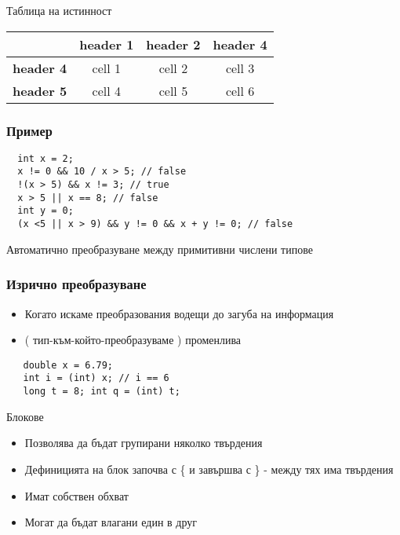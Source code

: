 \documentclass{beamer}
\begin{document}
\begin{frame}{Таблица на истинност}
  \transdissolve 
  \begin{tabular}{c||c|c|c|}
    & \textbf{header 1} &
    \textbf{header 2} & \textbf{header 4} \\
    \hline
    \hline
    \textbf{header 4} &cell 1 & cell 2 & cell 3 \\
    \hline
    \textbf{header 5} & cell 4 & cell 5 & cell 6 \\
  \end{tabular} 
\end{frame}

\begin{frame}[fragile]
  \frametitle{Пример}
  \transdissolve
\begin{lstlisting}
  int x = 2;
  x != 0 && 10 / x > 5; // false
  !(x > 5) && x != 3; // true
  x > 5 || x == 8; // false
  int y = 0;
  (x <5 || x > 9) && y != 0 && x + y != 0; // false
\end{lstlisting}
\end{frame}


\begin{frame}{Автоматично преобразуване между примитивни числени типове}
  \transdissolve  
\end{frame}


\begin{frame}[fragile]
  \frametitle{Изрично преобразуване}
  \transdissolve
  \begin{itemize}
  \item   Когато искаме преобразования водещи
    до загуба на информация
  \item ( тип-към-който-преобразуваме ) променлива
  \end{itemize}
  \begin{lstlisting}
   double x = 6.79;
   int i = (int) x; // i == 6
   long t = 8; int q = (int) t;
  \end{lstlisting}
\end{frame}

\begin{frame}{Блокове}
  \transdissolve
  \begin{itemize}
  \item Позволява да бъдат групирани няколко
    твърдения
   \item Дефиницията на блок започва с \{ и
      завършва с \} - между тях има
    твърдения
   \item Имат собствен обхват
   \item Могат да бъдат влагани един в друг
  \end{itemize}
\end{frame}
\end{document}

